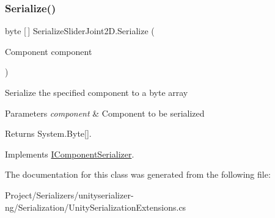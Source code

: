 \subsubsection{\texorpdfstring{Serialize()}{Serialize()}}
{\footnotesize\ttfamily byte \mbox{[}$\,$\mbox{]} Serialize\+Slider\+Joint2\+D.\+Serialize (\begin{DoxyParamCaption}\item[{Component}]{component }\end{DoxyParamCaption})\hspace{0.3cm}{\ttfamily [inline]}}



Serialize the specified component to a byte array 


\begin{DoxyParams}{Parameters}
{\em component} & Component to be serialized\\
\hline
\end{DoxyParams}
\begin{DoxyReturn}{Returns}
System.\+Byte\mbox{[}\mbox{]}.
\end{DoxyReturn}


Implements \hyperlink{interface_i_component_serializer_ab2aa38005665496b62d6c54b5f0dbd31}{I\+Component\+Serializer}.



The documentation for this class was generated from the following file\+:\begin{DoxyCompactItemize}
\item 
Project/\+Serializers/unityserializer-\/ng/\+Serialization/Unity\+Serialization\+Extensions.\+cs\end{DoxyCompactItemize}
